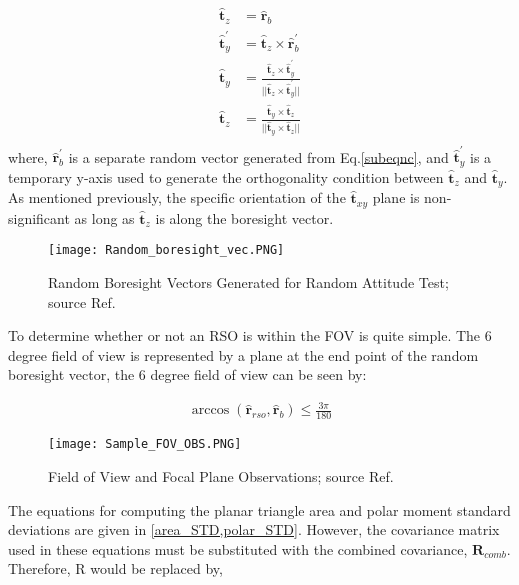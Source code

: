 \documentclass[]{aiaa-tc}%
\begin{document}
\begin{subequations}
\begin{align}
\hat{\textbf{t}}_z &= \hat{\textbf{r}}_b\\
\hat{\textbf{t}}^{'}_y &= \hat{\textbf{t}}_z \times \hat{\textbf{r}}^{'}_b\\
\hat{\textbf{t}}_y & = \frac{\hat{\textbf{t}}_z \times \hat{\textbf{t}}^{'}_y}{||\hat{\textbf{t}}_z \times \hat{\textbf{t}}^{'}_y||}\\
\hat{\textbf{t}}_z &= \frac{\hat{\textbf{t}}_y \times \hat{\textbf{t}}_z}{ || \hat{\textbf{t}}_y \times \hat{\textbf{t}}_z ||}\\
\end{align}
\end{subequations}
where, $\hat{\textbf{r}}^{'}_b$
is a separate random vector generated from Eq.\eqref{subeqnc}, and $\hat{\textbf{t}}^{'}_y$
is a temporary y-axis
used to generate the orthogonality condition between $\hat{\textbf{t}}_z$ and $\hat{\textbf{t}}_y$. As mentioned previously, the
specific orientation of the $\hat{\textbf{t}}_{xy}$ plane is non-significant as long as $\hat{\textbf{t}}_z$ is along the boresight vector.

\begin{figure}[h]
\centering
\texttt{[image: Random\_boresight\_vec.PNG]}
\caption{Random Boresight Vectors Generated for Random Attitude Test; source Ref.}
\label{RAT}
\end{figure}

To determine whether or not an RSO is within the FOV is quite simple. The 6 degree field
of view is represented by a plane at the end point of the random boresight vector, the 6 degree field of view can be seen by:

\begin{align}
\arccos(\hat{\textbf{r}}_{rso}, \hat{\textbf{r}}_b ) \leq \frac{3\pi}{180} \label{FOV_calculate}
\end{align} 

 \begin{figure}[h]
\centering
\texttt{[image: Sample\_FOV\_OBS.PNG]}
\caption{Field of View and Focal Plane Observations; source Ref.}
\label{FOV}
\end{figure}

The equations for computing the planar triangle area and polar moment standard deviations are given in \cref{area_STD,polar_STD}. However, the covariance matrix used in these equations must be substituted with the combined covariance, $\textbf{R}_{comb}$. Therefore, R would be replaced
by,
\end{document}

